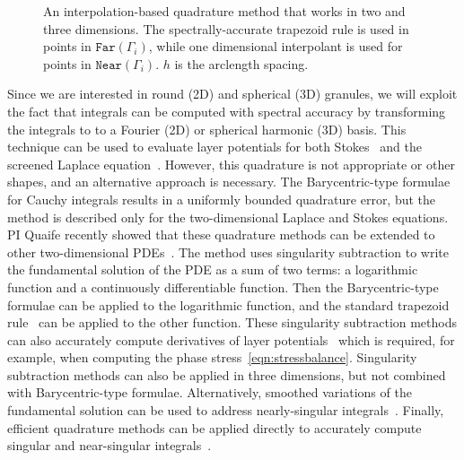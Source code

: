 \begin{figure}
  \vspace{-4pt}
  \centering
  
  \vspace{-15pt}
  \caption{\label{fig:interpquad} \footnotesize An interpolation-based
  quadrature method that works in two and three dimensions. The
  spectrally-accurate trapezoid rule is used in points in
  $\mathtt{Far}(\Gamma_i)$, while one dimensional interpolant is used
  for points in $\mathtt{Near}(\Gamma_i)$. $h$ is the arclength
  spacing.}
\end{figure}
Since we are interested in round (2D) and spherical (3D) granules, we
will exploit the fact that integrals can be computed with spectral
accuracy by transforming the integrals to to a Fourier (2D) or spherical
harmonic (3D) basis. This technique can be used to evaluate layer
potentials for both Stokes~\cite{cor-vee2018} and the screened Laplace
equation~\cite{koh-cor-che-vee2021}. However, this quadrature is not
appropriate or other shapes, and an alternative approach is necessary.
The Barycentric-type formulae for Cauchy integrals results in a
uniformly bounded quadrature error, but the method is described only for
the two-dimensional Laplace and Stokes equations. PI Quaife recently
showed that these quadrature methods can be extended to other
two-dimensional PDEs~\cite{che-lin-her-qua2022}. The method uses
singularity subtraction to write the fundamental solution of the PDE as a
sum of two terms: a logarithmic function and a continuously
differentiable function. Then the Barycentric-type formulae can be
applied to the logarithmic function, and the standard trapezoid
rule~\cite{tre-wei2014} can be applied to the other function. These
singularity subtraction methods can also accurately compute derivatives
of layer potentials~\cite{car2021, car2020, car-kha-kim2018} which is
required, for example, when computing the phase
stress~\eqref{eqn:stressbalance}. Singularity subtraction methods can
also be applied in three dimensions, but not combined with
Barycentric-type formulae. Alternatively, smoothed variations of the
fundamental solution can be used to address nearly-singular
integrals~\cite{beale1, cor2001, tlu-bea2019}. Finally, efficient
quadrature methods can be applied directly to accurately compute
singular and near-singular integrals~\cite{khayat_2005,
gimbutas2013sisc}.

